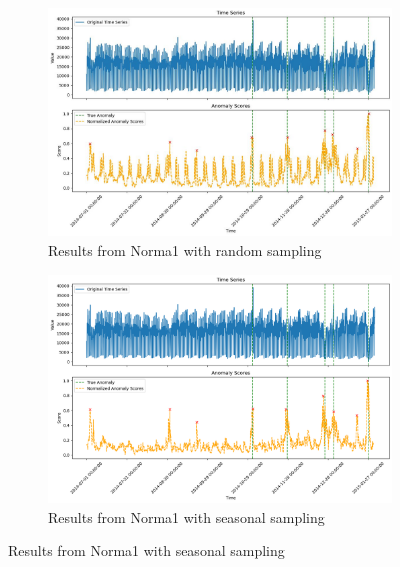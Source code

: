 \documentclass[11pt]{article}
\begin{document}
\begin{figure}[h]
    \centering
    \begin{subfigure}[b]{0.35\textwidth}
        \includegraphics[width=\textwidth]{algo0.jpg}
        \caption{Results from Norma1 with random sampling}
        \label{fig:algo0}
    \end{subfigure}

    \begin{subfigure}[b]{0.35\textwidth}
        \includegraphics[width=\textwidth]{algo1.png}
        \caption{Results from Norma1 with seasonal sampling}
        \label{fig:algo1}
    \end{subfigure}


\end{figure}
\end{document}
